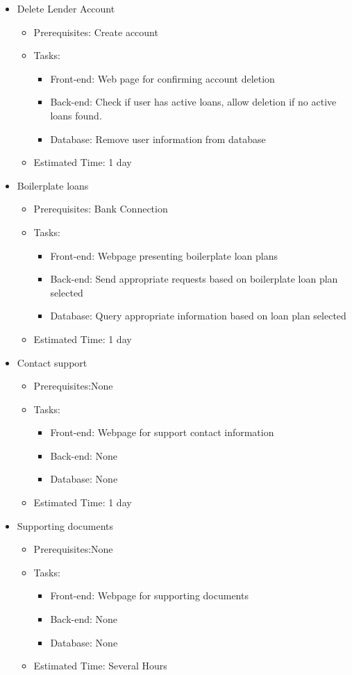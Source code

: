 \begin{itemize}
	\item Delete Lender Account
	\begin{itemize}
		\item Prerequisites: Create account
		\item Tasks:
		\begin{itemize}
			\item Front-end: Web page for confirming account deletion
			\item Back-end: Check if user has active loans, allow deletion if no active loans found.
			\item Database: Remove user information from database
		\end{itemize}
		\item Estimated Time: 1 day
	\end{itemize}

	\item Boilerplate loans
	\begin{itemize}
		\item Prerequisites: Bank Connection
		\item Tasks:
		\begin{itemize}
			\item Front-end: Webpage presenting boilerplate loan plans
			\item Back-end: Send appropriate requests based on boilerplate loan plan selected
			\item Database: Query appropriate information based on loan plan selected
		\end{itemize}
		\item Estimated Time: 1 day
	\end{itemize}

	\item Contact support
	\begin{itemize}
		\item Prerequisites:None
		\item Tasks:
		\begin{itemize}
			\item Front-end: Webpage for support contact information
			\item Back-end: None
			\item Database: None
		\end{itemize}
		\item Estimated Time: 1 day
	\end{itemize}

	\item Supporting documents
	\begin{itemize}
		\item Prerequisites:None
		\item Tasks:
		\begin{itemize}
			\item Front-end: Webpage for supporting documents
			\item Back-end: None
			\item Database: None
		\end{itemize}
		\item Estimated Time: Several Hours
	\end{itemize}
\end{itemize}

